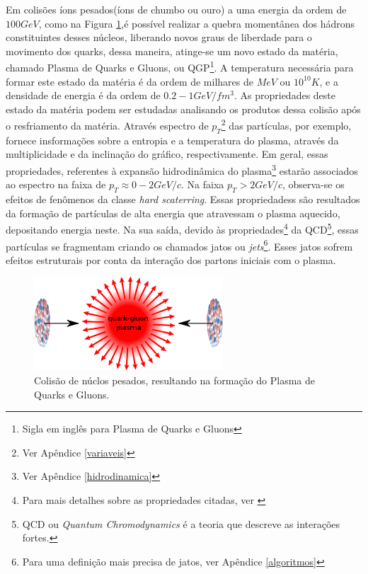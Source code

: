 Em colisões íons pesados(íons de chumbo ou ouro) a uma energia da ordem de $100 GeV$,
como na Figura \ref{qgp},é possível realizar a quebra momentânea dos hádrons constituintes desses núcleos, liberando novos graus
de liberdade para o movimento dos quarks, dessa maneira, atinge-se um novo estado da matéria, chamado Plasma de Quarks e Gluons,
ou QGP\footnote{Sigla em inglês para Plasma de Quarks e Gluons}. A temperatura necessária para formar este estado da matéria é da
ordem de milhares de $MeV$ ou $10^{10} K$, e a densidade de energia é da ordem de $0.2-1 GeV/fm^{3}$. As propriedades deste estado
da matéria podem ser estudadas analisando os produtos dessa colisão após o resfriamento da matéria. Através espectro de
$p_T$\footnote{Ver Apêndice \ref{variaveis}} das partículas, por exemplo, fornece insformações sobre a entropia e a temperatura do
plasma, através da multiplicidade e da inclinação do gráfico, respectivamente. Em geral, essas propriedades, referentes à expansão
hidrodinâmica do plasma\footnote{Ver Apêndice \ref{hidrodinamica}} estarão associados ao espectro na faixa de $p_T \approx 0-2 GeV/c$.
Na faixa $p_T > 2 GeV/c$, observa-se os efeitos de fenômenos da classe {\it hard scaterring}. Essas propriedadess são resultados da formação
de partículas de alta energia que atravessam o plasma aquecido, depositando energia neste. Na sua saída, devido às propriedades\footnote{Para
mais detalhes sobre as propriedades citadas, ver \cite{skands_introduction_2013}} da QCD\footnote{QCD ou {\it Quantum Chromodynamics}
é a teoria que descreve as interações fortes.}, essas partículas se fragmentam criando os chamados jatos ou {\it jets}\footnote{Para
uma definição mais precisa de jatos, ver Apêndice \ref{algoritmos}}. Esses jatos sofrem efeitos estruturais por conta da interação dos
partons iniciais\cite{lokhtin_angular_1998,bass_systematic_2009,connors_review_2017,nattrass_jet_2018,denterria_jet_2009} com o plasma.

%

\begin{figure}[!h]
 \centering
 \includegraphics[scale=1]{Content/qgp.png}
 \caption{Colisão de núclos pesados, resultando na formação do Plasma de Quarks e Gluons.}
 \label{qgp}
\end{figure}


